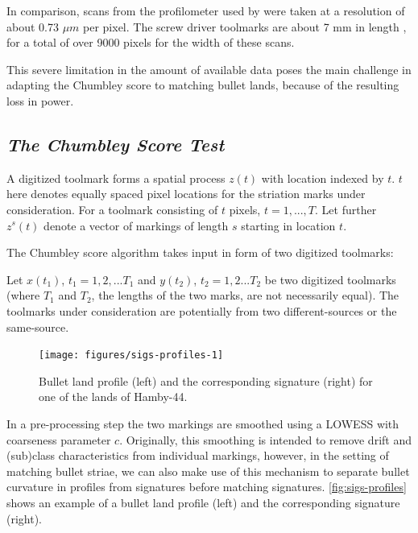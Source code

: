 \documentclass[12pt]{article}
\begin{document}
In comparison, scans from the profilometer used by
\citet{chumbley, hadler} were taken at a resolution of about 0.73
\(\mu m\) per pixel. The screw driver toolmarks are about 7 mm in length
\citep{manytoolmarks1}, for a total of over 9000 pixels for the width of
these scans.

This severe limitation in the amount of available data poses the main
challenge in adapting the Chumbley score to matching bullet lands,
because of the resulting loss in power.

\hypertarget{the-chumbley-score-test}{%
\subsection*{\texorpdfstring{\emph{The Chumbley Score
Test}}{The Chumbley Score Test}}\label{the-chumbley-score-test}}

A digitized toolmark forms a spatial process \(z(t)\) with location
indexed by \(t\). \(t\) here denotes equally spaced pixel locations for
the striation marks under consideration. For a toolmark consisting of
\(t\) pixels, \(t = 1, ..., T\). Let further \(z^s(t)\) denote a vector
of markings of length \(s\) starting in location \(t\).

The Chumbley score algorithm takes input in form of two digitized
toolmarks:

Let \(x(t_1)\), \(t_1 = 1,2,...T_1\) and \(y(t_2)\), \(t_2 = 1,2...T_2\)
be two digitized toolmarks (where \(T_1\) and \(T_2\), the lengths of
the two marks, are not necessarily equal). The toolmarks under
consideration are potentially from two different-sources or the
same-source.

\begin{figure}

{\centering \texttt{[image: figures/sigs-profiles-1]} 

}

\caption{Bullet land profile (left) and the corresponding signature (right) for one of the lands of Hamby-44.}\label{fig:sigs-profiles}
\end{figure}

In a pre-processing step the two markings are smoothed using a LOWESS
\citep{lowess} with coarseness parameter \(c\). Originally, this
smoothing is intended to remove drift and (sub)class characteristics
from individual markings, however, in the setting of matching bullet
striae, we can also make use of this mechanism to separate bullet
curvature in profiles from signatures before matching signatures.
\autoref{fig:sigs-profiles} shows an example of a bullet land profile
(left) and the corresponding signature (right).
\end{document}
